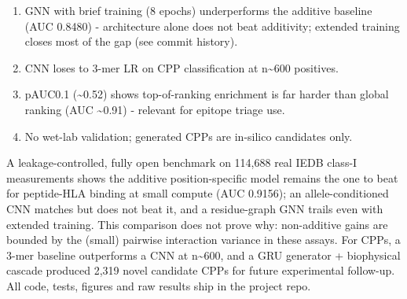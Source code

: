 
\begin{enumerate}
\def\labelenumi{\arabic{enumi}.}
\tightlist
\item
  GNN with brief training (8 epochs) underperforms the additive baseline (AUC 0.8480) - architecture alone does not beat additivity; extended training closes most of the gap (see commit history).
\item
  CNN loses to 3-mer LR on CPP classification at n\textasciitilde600 positives.
\item
  pAUC0.1 (\textasciitilde0.52) shows top-of-ranking enrichment is far harder than global ranking (AUC \textasciitilde0.91) - relevant for epitope triage use.
\item
  No wet-lab validation; generated CPPs are in-silico candidates only.
\end{enumerate}


A leakage-controlled, fully open benchmark on 114,688 real IEDB class-I measurements shows the additive position-specific model remains the one to beat for peptide-HLA binding at small compute (AUC 0.9156); an allele-conditioned CNN matches but does not beat it, and a residue-graph GNN trails even with extended training. This comparison does not prove why: non-additive gains are bounded by the (small) pairwise interaction variance in these assays. For CPPs, a 3-mer baseline outperforms a CNN at n\textasciitilde600, and a GRU generator + biophysical cascade produced 2,319 novel candidate CPPs for future experimental follow-up. All code, tests, figures and raw results ship in the project repo.


